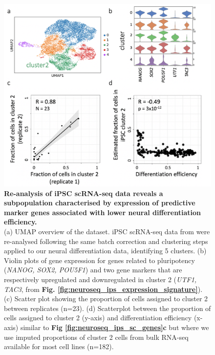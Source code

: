 \begin{figure}[h]
    \centering
    \includegraphics[width=15cm]{Appendix2/Fig/suppl_ips_cluster2.png}
    \caption[An iPSC sub-population is associated with lower differentiation efficiency]{\textbf{Re-analysis of iPSC scRNA-seq data reveals a subpopulation characterised by expression of predictive marker genes associated with lower neural differentiation efficiency.}\\
     (a) UMAP overview of the dataset. 
     iPSC scRNA-seq data from \cite{cuomo2020single} were re-analysed following the same batch correction and clustering steps applied to our neural differentiation data, identifying 5 clusters. 
     (b) Violin plots of gene expression for genes related to pluripotency (\textit{NANOG, SOX2, POU5F1}) and two gene markers that are respectively upregulated and downregulated in cluster 2 (\textit{UTF1, TAC3}, from \textbf{Fig. \ref{fig:neuroseq_ips_expression_signature}}). 
     (c) Scatter plot showing the proportion of cells assigned to cluster 2 between replicates (n=23). 
     (d) Scatterplot between the proportion of cells assigned to cluster 2 (y-axis) and differentiation efficiency (x-axis) similar to \textbf{Fig \ref{fig:neuroseq_ips_sc_genes}c} but where we use imputed proportions of cluster 2 cells from bulk RNA-seq available for most cell lines (n=182).}
    \label{suppl_fig:ipsc_cluster2}
\end{figure}


